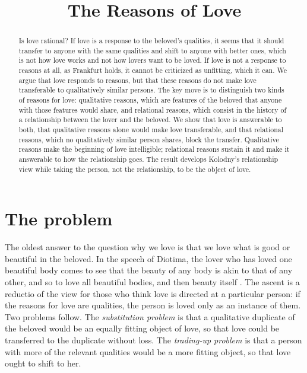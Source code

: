 \documentclass{situationist-preprint}
\title{The Reasons of Love}
\begin{document}
\maketitle

\begin{abstract}
Is love rational? If love is a response to the beloved's qualities, it seems that it should transfer to anyone with the same qualities and shift to anyone with better ones, which is not how love works and not how lovers want to be loved. If love is not a response to reasons at all, as Frankfurt holds, it cannot be criticized as unfitting, which it can. We argue that love responds to reasons, but that these reasons do not make love transferable to qualitatively similar persons. The key move is to distinguish two kinds of reasons for love: qualitative reasons, which are features of the beloved that anyone with those features would share, and relational reasons, which consist in the history of a relationship between the lover and the beloved. We show that love is answerable to both, that qualitative reasons alone would make love transferable, and that relational reasons, which no qualitatively similar person shares, block the transfer. Qualitative reasons make the beginning of love intelligible; relational reasons sustain it and make it answerable to how the relationship goes. The result develops Kolodny's relationship view while taking the person, not the relationship, to be the object of love.
\end{abstract}

\section{The problem}

The oldest answer to the question why we love is that we love what is good or beautiful in the beloved. In the speech of Diotima, the lover who has loved one beautiful body comes to see that the beauty of any body is akin to that of any other, and so to love all beautiful bodies, and then beauty itself \citep[210a--212a]{PlatoSymp}. The ascent is a reductio of the view for those who think love is directed at a particular person: if the reasons for love are qualities, the person is loved only as an instance of them. Two problems follow. The \emph{substitution problem} is that a qualitative duplicate of the beloved would be an equally fitting object of love, so that love could be transferred to the duplicate without loss. The \emph{trading-up problem} is that a person with more of the relevant qualities would be a more fitting object, so that love ought to shift to her.
\end{document}
